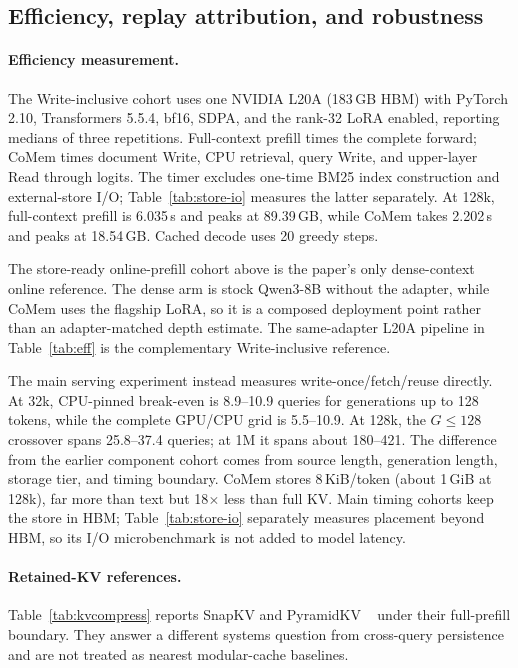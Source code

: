 \subsection{Efficiency, replay attribution, and robustness}
\paragraph{Efficiency measurement.}
\label{app:efficiency}
The Write-inclusive cohort uses one NVIDIA L20A (183\,GB HBM) with PyTorch 2.10,
Transformers 5.5.4, bf16, SDPA, and the rank-32 LoRA enabled, reporting medians
of three repetitions. Full-context prefill times the complete forward; CoMem
times document Write, CPU retrieval, query Write, and upper-layer Read through
logits. The timer excludes one-time BM25 index construction and external-store
I/O; Table~\ref{tab:store-io} measures the latter separately. At 128k,
full-context prefill is 6.035\,s and peaks at 89.39\,GB, while CoMem takes
2.202\,s and peaks at 18.54\,GB. Cached decode uses 20 greedy steps.



The store-ready online-prefill cohort above is the paper's only dense-context
online reference. The dense arm is stock Qwen3-8B without the adapter, while
CoMem uses the flagship LoRA, so it is a composed deployment point rather than
an adapter-matched depth estimate. The same-adapter L20A pipeline in
Table~\ref{tab:eff} is the complementary Write-inclusive reference.

The main serving experiment instead measures write-once/fetch/reuse directly.
At 32k, CPU-pinned break-even is 8.9--10.9 queries for generations up to
128 tokens, while the complete GPU/CPU grid is 5.5--10.9. At 128k, the
$G\le128$ crossover spans 25.8--37.4 queries; at 1M it spans about
180--421. The difference from the earlier component
cohort comes from source length, generation length, storage tier, and timing
boundary.
CoMem stores 8\,KiB/token (about
1\,GiB at 128k), far more than text but 18$\times$ less than full KV. Main timing
cohorts keep the store in HBM; Table~\ref{tab:store-io} separately measures
placement beyond HBM, so its I/O microbenchmark is not added to model latency.

\paragraph{Retained-KV references.}
Table~\ref{tab:kvcompress} reports SnapKV and PyramidKV
~\citep{snapkv,pyramidkv} under their full-prefill boundary. They answer a
different systems question from cross-query persistence and are not treated as
nearest modular-cache baselines.

